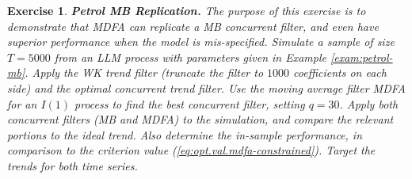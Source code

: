 \documentclass[a4paper]{book}
\newtheorem{Exercise}{Exercise}
\begin{document}
\begin{Exercise} {\bf Petrol MB Replication.}  \rm
\label{exer:petrol-mb}
 The purpose of this exercise is to demonstrate that MDFA can replicate
 a MB concurrent filter, and even have superior performance when the 
 model is mis-specified. 
 Simulate a sample of size $T=5000$ from an LLM process with parameters
 given in Example \ref{exam:petrol-mb}.   Apply the WK trend filter
(truncate the filter to $1000$ coefficients on each side) and the 
 optimal concurrent trend filter.  
 Use the moving average filter  MDFA  for an $I(1)$ process  to find the best
 concurrent filter, setting $q= 30$.
    Apply both concurrent filters (MB and MDFA)
 to the simulation, and compare the relevant portions to the ideal trend.
 Also determine the in-sample performance, in comparison to the criterion value
 (\ref{eq:opt.val.mdfa-constrained}).   Target the trends for both time series.
\end{Exercise}
\end{document}

